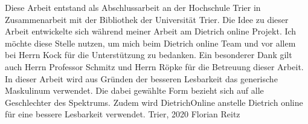 \preface

Diese Arbeit entstand als Abschlussarbeit an der Hochschule Trier in Zusammenarbeit mit der Bibliothek der Universität Trier. 
\newline
\newline
Die Idee zu dieser Arbeit entwickelte sich während meiner Arbeit am Dietrich online Projekt. Ich möchte diese Stelle nutzen, um mich beim Dietrich online Team und vor allem bei Herrn Kock für die Unterstützung zu bedanken.
\newline
\newline
Ein besonderer Dank gilt auch Herrn Professor Schmitz und Herrn Röpke für die Betreuung dieser Arbeit.
\newline
\newline
In dieser Arbeit wird aus Gründen der besseren Lesbarkeit das generische Maskulinum verwendet. Die dabei gewählte Form bezieht sich auf alle Geschlechter des Spektrums. 
\newline
Zudem wird DietrichOnline anstelle Dietrich online für eine bessere Lesbarkeit verwendet.
\newline
\newline
Trier, 2020
\newline
\noindent Florian Reitz